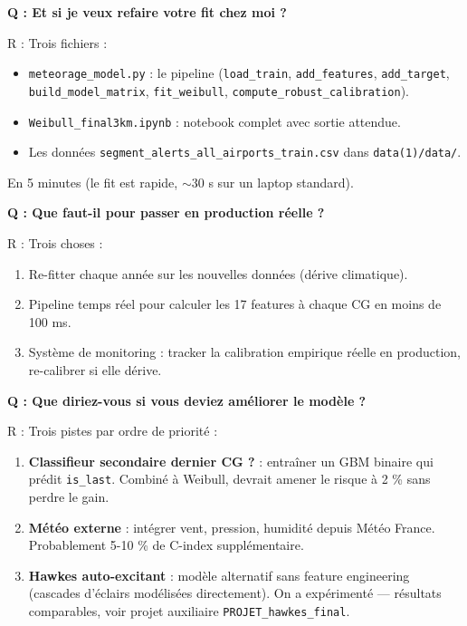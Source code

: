 \documentclass[11pt,a4paper]{article}
\begin{document}
\begin{piege}
\textbf{Q : Et si je veux refaire votre fit chez moi ?}

R : Trois fichiers :
\begin{itemize}[topsep=2pt]
    \item \texttt{meteorage\_model.py} : le pipeline (\texttt{load\_train},
    \texttt{add\_features}, \texttt{add\_target}, \texttt{build\_model\_matrix},
    \texttt{fit\_weibull}, \texttt{compute\_robust\_calibration}).
    \item \texttt{Weibull\_final3km.ipynb} : notebook complet avec sortie attendue.
    \item Les données \texttt{segment\_alerts\_all\_airports\_train.csv} dans
    \texttt{data(1)/data/}.
\end{itemize}
En 5 minutes (le fit est rapide, $\sim 30$ s sur un laptop standard).
\end{piege}

\begin{piege}
\textbf{Q : Que faut-il pour passer en production réelle ?}

R : Trois choses :
\begin{enumerate}[topsep=2pt]
    \item Re-fitter chaque année sur les nouvelles données (dérive climatique).
    \item Pipeline temps réel pour calculer les 17 features à chaque CG en moins de 100 ms.
    \item Système de monitoring : tracker la calibration empirique réelle en production,
    re-calibrer si elle dérive.
\end{enumerate}
\end{piege}

\begin{piege}
\textbf{Q : Que diriez-vous si vous deviez améliorer le modèle ?}

R : Trois pistes par ordre de priorité :
\begin{enumerate}[topsep=2pt]
    \item \textbf{Classifieur secondaire \og dernier CG ? \fg{}} : entraîner un GBM
    binaire qui prédit \texttt{is\_last}. Combiné à Weibull, devrait amener le risque
    à 2 \% sans perdre le gain.
    \item \textbf{Météo externe} : intégrer vent, pression, humidité depuis Météo France.
    Probablement 5-10 \% de C-index supplémentaire.
    \item \textbf{Hawkes auto-excitant} : modèle alternatif sans feature engineering
    (cascades d'éclairs modélisées directement). On a expérimenté — résultats comparables,
    voir projet auxiliaire \texttt{PROJET\_hawkes\_final}.
\end{enumerate}
\end{piege}
\end{document}
